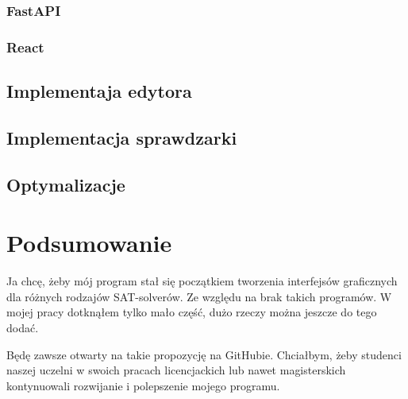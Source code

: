 \documentclass[a4paper,12pt,oneside]{book}
\theoremstyle{definition}
\begin{document}
\lipsum[1]

\lipsum[2]

\lipsum[3]

\subsection{FastAPI}

\lipsum[1]

\lipsum[2]

\lipsum[3]

\subsection{React}

\lipsum[1]

\lipsum[2]

\lipsum[3]

\section{Implementaja edytora}

\lipsum[1]

\lipsum[2]

\lipsum[3]

\section{Implementacja sprawdzarki}

\lipsum[1]

\lipsum[2]

\lipsum[3]

\section{Optymalizacje}

\lipsum[1]

\lipsum[2]

\lipsum[3]

\lipsum[4]

\chapter*{Podsumowanie}

Ja chcę, żeby mój program stał się początkiem tworzenia interfejsów graficznych dla różnych rodzajów SAT-solverów. Ze względu na brak takich programów. W mojej pracy dotknąłem tylko mało część, dużo rzeczy można jeszcze do tego dodać.

Będę \cite{einstein} zawsze otwarty na takie propozycję na GitHubie. Chciałbym, żeby \cite{dirac} studenci naszej uczelni w \cite{dirac} swoich pracach licencjackich lub \cite{knuthwebsite} nawet magisterskich \cite{knuth-fa} kontynuowali rozwijanie i polepszenie mojego programu.

\printbibliography[title=Bibliografia]

\end{document}
